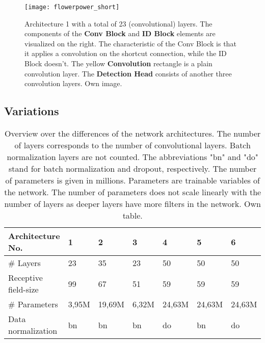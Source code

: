 \begin{figure}[!tbp]
	\centering
    \texttt{[image: flowerpower\_short]}
    \caption{Architecture 1 with a total of 23 (convolutional) layers. The components of the \textbf{Conv Block} and \textbf{ID Block} elements are visualized on the right. The characteristic of the Conv Block is that it applies a convolution on the shortcut connection, while the ID Block doesn't. The yellow \textbf{Convolution} rectangle is a plain convolution layer. The \textbf{Detection Head} consists of another three convolution layers. Own image.}
    	\label{fig:network_architecture}
\end{figure}

\subsection{Variations} \label{section:network_variations}

\begin{table}[]
\centering
\begin{tabular}{|l||llllll|}
\hline Architecture No.        & 1          & 2          & 3          & 4          & 5          & 6        \\ \hline\hline
\rowcolor{Gray}
\# Layers               & 23         & 35         & 23         & 50         & 50         & 50       \\
Receptive field-size    & 99         & 67         & 51         & 59         & 59         & 59       \\
\rowcolor{Gray}
\# Parameters & 3,95M  & 19,69M & 6,32M  & 24,63M & 24,63M   & 24,63M \\
Data normalization      & bn & bn & bn & do    & bn & do \\ \hline
\end{tabular}
\caption{Overview over the differences of the network architectures. The number of layers corresponds to the number of convolutional layers. Batch normalization layers are not counted. The abbreviations "bn" and "do" stand for batch normalization and dropout, respectively. The number of parameters is given in millions. Parameters are trainable variables of the network. The number of parameters does not scale linearly with the number of layers as deeper layers have more filters in the network. Own table.}
\label{table:network_architectures}
\end{table}

